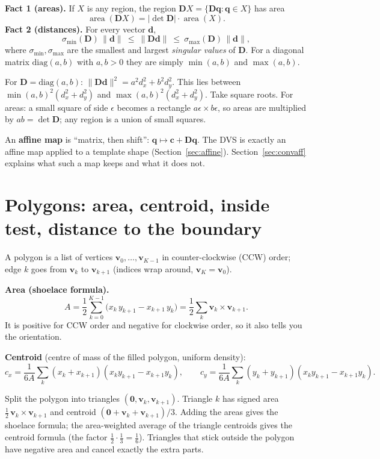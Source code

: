 \documentclass[11pt,a4paper]{article}
\newcommand{\vect}[1]{\mathbf{#1}}
\begin{document}
\textbf{Fact 1 (areas).} If $X$ is any region, the region $\vect{D}X=\{\vect{D}\vect{q}:\vect{q}\in X\}$ has area
\[
\operatorname{area}(\vect{D}X)=|\det\vect{D}|\cdot\operatorname{area}(X).
\]
\textbf{Fact 2 (distances).} For every vector $\vect{d}$,
\[
\sigma_{\min}(\vect{D})\,\|\vect{d}\|\ \le\ \|\vect{D}\vect{d}\|\ \le\ \sigma_{\max}(\vect{D})\,\|\vect{d}\|,
\]
where $\sigma_{\min},\sigma_{\max}$ are the smallest and largest \emph{singular values} of $\vect{D}$. For a
diagonal matrix $\mathrm{diag}(a,b)$ with $a,b>0$ they are simply $\min(a,b)$ and $\max(a,b)$.

\begin{whybox}
For $\vect{D}=\mathrm{diag}(a,b)$: $\|\vect{D}\vect{d}\|^2=a^2d_x^2+b^2d_y^2$. This lies between
$\min(a,b)^2(d_x^2+d_y^2)$ and $\max(a,b)^2(d_x^2+d_y^2)$. Take square roots. For areas: a small square of side
$\epsilon$ becomes a rectangle $a\epsilon\times b\epsilon$, so areas are multiplied by $ab=\det\vect{D}$; any region is
a union of small squares.
\end{whybox}

An \textbf{affine map} is ``matrix, then shift'': $\vect{q}\mapsto\vect{c}+\vect{D}\vect{q}$. The DVS is exactly an
affine map applied to a template shape (Section~\ref{sec:affine}). Section~\ref{sec:convaff} explains what such a map keeps and what it does not.

\section{Polygons: area, centroid, inside test, distance to the boundary}\label{sec:polygons}

A polygon is a list of vertices $\vect{v}_0,\dots,\vect{v}_{K-1}$ in counter-clockwise (CCW) order; edge $k$ goes
from $\vect{v}_k$ to $\vect{v}_{k+1}$ (indices wrap around, $\vect{v}_K=\vect{v}_0$).

\textbf{Area (shoelace formula).}
\[
A=\frac12\sum_{k=0}^{K-1}\big(x_k\,y_{k+1}-x_{k+1}\,y_k\big)=\frac12\sum_k \vect{v}_k\times\vect{v}_{k+1}.
\]
It is positive for CCW order and negative for clockwise order, so it also tells you the orientation.

\textbf{Centroid} (centre of mass of the filled polygon, uniform density):
\[
c_x=\frac{1}{6A}\sum_k (x_k+x_{k+1})(x_ky_{k+1}-x_{k+1}y_k),\qquad
c_y=\frac{1}{6A}\sum_k (y_k+y_{k+1})(x_ky_{k+1}-x_{k+1}y_k).
\]

\begin{whybox}
Split the polygon into triangles $(\vect{0},\vect{v}_k,\vect{v}_{k+1})$. Triangle $k$ has signed area
$\tfrac12\,\vect{v}_k\times\vect{v}_{k+1}$ and centroid $(\vect{0}+\vect{v}_k+\vect{v}_{k+1})/3$. Adding the areas
gives the shoelace formula; the area-weighted average of the triangle centroids gives the centroid formula (the
factor $\tfrac12\cdot\tfrac13=\tfrac16$). Triangles that stick outside the polygon have negative area and cancel
exactly the extra parts.
\end{whybox}
\end{document}
